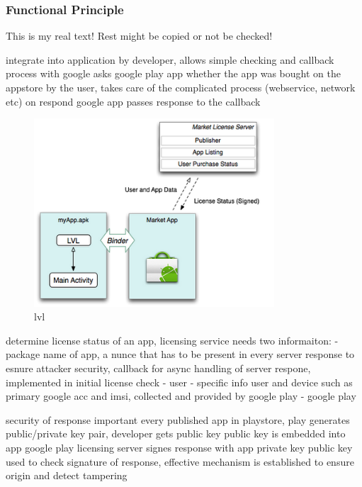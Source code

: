 \subsubsection{Functional Principle} \label{subsection:license-google-functional}
This is my real text! Rest might be copied or not be checked!

%
integrate into application by developer, allows simple checking and callback process with google
asks google play app whether the app was bought on the appstore by the user, takes care of the complicated process (webservice, network etc)
on respond google app passes response to the callback
\begin{figure}[h]
    \centering
    \includegraphics[width=0.8\textwidth]{data/lvl.png}
    \caption{lvl \cite{developersLicensingBlog}}
    \label{fig:lvl}
\end{figure}

determine license status of an app, licensing service needs two informaiton:
- package name of app, a nunce that has to be present in every server response to esnure attacker security, callback for async handling of server respone, implemented in initial license check - user
- specific info user and device such as primary google acc and imsi, collected and provided by google play - google play

security of response important
every published app in playstore, play generates public/private key pair, developer gets public key
public key is embedded into app
google play licensing server signes response with app private key
public key used to check signature of response, effective mechanism is established to ensure origin and detect tampering
\cite{munteanLicense}
%

